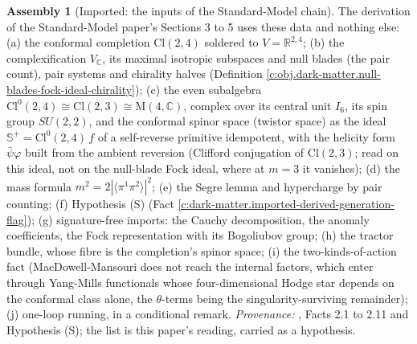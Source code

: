 \documentclass[11pt]{article}
\theoremstyle{definition}
\newtheorem{assembled}[theorem]{Assembly}
\theoremstyle{plain}
\newcommand{\changedmark}[2]{\marginpar{\raggedright\scriptsize\color{#1}#2}}
\providecommand{\C}{}\renewcommand{\C}{\mathbb{C}}
\providecommand{\CS}{}\renewcommand{\CS}{{\mathbb{S}^{+}}}
\providecommand{\Cl}{}\renewcommand{\Cl}{\mathrm{Cl}}
\providecommand{\Mat}{}\renewcommand{\Mat}{\mathrm{M}}
\providecommand{\R}{}\renewcommand{\R}{\mathbb{R}}
\providecommand{\br}{}\renewcommand{\br}[1]{\langle #1\rangle}
\begin{document}
\begin{assembled}[Imported: the inputs of the Standard-Model chain]\label{c:dark-matter.imported-inputs-standard-model-chain}
\changedmark{gray}{reworded}
The derivation of the Standard-Model paper's Sections 3 to 5 uses these data and nothing else: (a) the conformal completion $\Cl(2,4)$ soldered to $V = \R^{2,4}$; (b) the complexification $V_{\C}$, its maximal isotropic subspaces and null blades (the pair count), pair systems and chirality halves (Definition \ref{c:obj.dark-matter.null-blades-fock-ideal-chirality}); (c) the even subalgebra $\Cl^{0}(2,4) \cong \Cl(2,3) \cong \Mat(4,\C)$, complex over its central unit $I_6$, its spin group $SU(2,2)$, and the conformal spinor space (twistor space) as the ideal $\CS = \Cl^{0}(2,4)\,f$ of a self-reverse primitive idempotent, with the helicity form $\bar{\psi}\varphi$ built from the ambient reversion (Clifford conjugation of $\Cl(2,3)$; read on this ideal, not on the null-blade Fock ideal, where at $m = 3$ it vanishes); (d) the mass formula $m^{2} = 2|\br{\pi^{1}\pi^{2}}|^{2}$; (e) the Segre lemma and hypercharge by pair counting; (f) Hypothesis (S) (Fact \ref{c:dark-matter.imported-derived-generation-flag}); (g) signature-free imports: the Cauchy decomposition, the anomaly coefficients, the Fock representation with its Bogoliubov group; (h) the tractor bundle, whose fibre is the completion's spinor space; (i) the two-kinds-of-action fact (MacDowell-Mansouri does not reach the internal factors, which enter through Yang-Mills functionals whose four-dimensional Hodge star depends on the conformal class alone, the $\theta$-terms being the singularity-surviving remainder); (j) one-loop running, in a conditional remark. \emph{Provenance:} \cite[\S\S2-5]{ButlerT12}, Facts 2.1 to 2.11 and Hypothesis (S); the list is this paper's reading, carried as a hypothesis.
\end{assembled}
\end{document}
